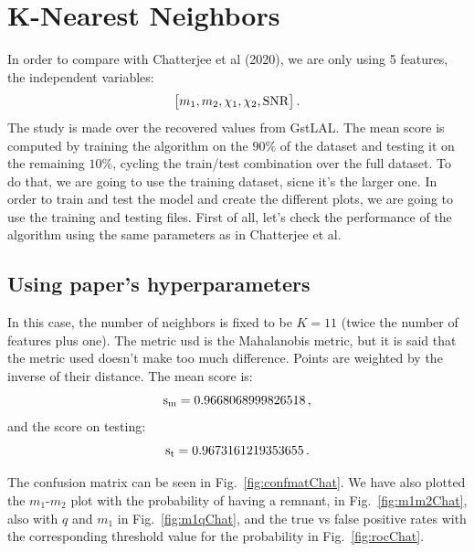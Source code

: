 \documentclass[prd,aps,twocolumn,a4paper,showkeys,nofootinbib]{revtex4-2}
\begin{document}
\newpage

\section{K-Nearest Neighbors}

In order to compare with Chatterjee et al (2020), we are only using 5 features, the independent variables: 
\begin{equation*}
	\big[m_1,m_2,\chi_1,\chi_2, \rm{SNR}\big]\,.
\end{equation*}
The study is made over the recovered values from GstLAL.  The mean score is computed by training the algorithm on the $90\%$ of the dataset and testing it on the remaining $10\%$, cycling the train/test combination over the full dataset. To do that, we are going to use the training dataset, sicne it's the larger one. In order to train and test the model and create the different plots, we are going to use the training and testing files. First of all, let's check the performance of the algorithm using the same parameters as in Chatterjee et al.

\subsection{Using paper's hyperparameters}
In this case, the number of neighbors is fixed to be $K=11$ (twice the number of features plus one). The metric usd is the Mahalanobis metric, but it is said that the metric used doesn't make too much difference. Points are weighted by the inverse of their distance.  The mean score is:
\begin{equation*}
	\rm{s_m} = 0.9668068999826518\,,
\end{equation*}
and the score on testing:
\begin{equation*}
	\rm{s_t} = 0.9673161219353655 \,.
\end{equation*}

The confusion matrix can be seen in Fig.~\ref{fig:confmatChat}. We have also plotted the $m_1$-$m_2$ plot with the probability of having a remnant, in Fig.~\ref{fig:m1m2Chat}, also with $q$ and $m_1$ in Fig.~\ref{fig:m1qChat}, and the true vs false positive rates with the corresponding threshold value for the probability in Fig.~\ref{fig:rocChat}.
\end{document}
